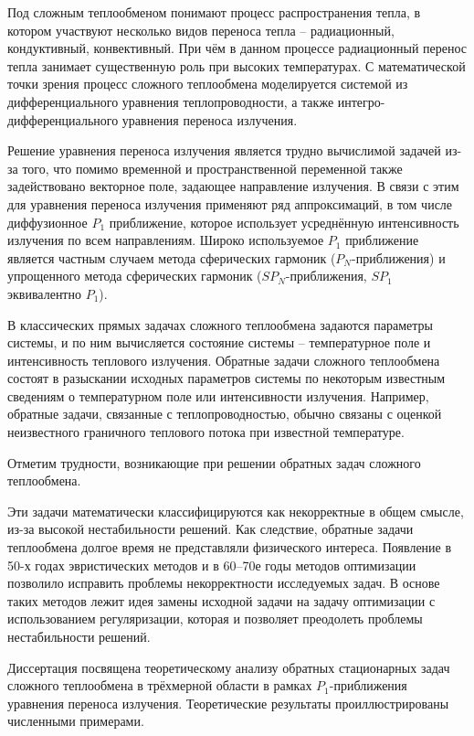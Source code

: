 {\actuality}
Под сложным теплообменом понимают процесс распространения тепла,
в котором участвуют несколько видов переноса тепла – радиационный, кондуктивный, конвективный.
При чём в данном процессе радиационный перенос тепла занимает существенную роль при высоких температурах.
С математической точки зрения процесс сложного теплообмена моделируется системой из
дифференциального уравнения теплопроводности, а также интегро-дифференциального
уравнения переноса излучения.


Решение уравнения переноса излучения является трудно вычислимой задачей из-за того,
что помимо временной и пространственной переменной также задействовано
векторное поле, задающее направление излучения.
В связи с этим для уравнения переноса излучения применяют ряд аппроксимаций,
в том числе диффузионное $P_1$ приближение, которое использует
усреднённую интенсивность излучения по всем направлениям.
Широко используемое $P_1$ приближение является частным случаем метода сферических
гармоник ($P_N$-приближения) и упрощенного метода сферических гармоник
($SP_N$-приближения, $SP_1$ эквивалентно $P_1$).


В классических прямых задачах сложного теплообмена задаются параметры системы, и по ним вычисляется
состояние системы – температурное поле и интенсивность теплового излучения.
Обратные задачи сложного теплообмена состоят в разыскании исходных параметров системы по некоторым
известным сведениям о температурном поле или интенсивности излучения.
Например, обратные задачи, связанные с теплопроводностью, обычно связаны с
оценкой неизвестного граничного теплового потока при известной температуре.


Отметим трудности, возникающие при решении обратных задач сложного теплообмена.


Эти задачи математически классифицируются как некорректные в общем смысле,
из-за высокой нестабильности решений.
Как следствие, обратные задачи теплообмена долгое время не представляли физического интереса.
Появление в 50-х годах эвристических методов и в 60–70е годы методов оптимизации
позволило исправить проблемы некорректности исследуемых задач.
В основе таких методов лежит идея замены исходной задачи на задачу оптимизации
с использованием регуляризации, которая и позволяет преодолеть проблемы нестабильности решений.



Диссертация посвящена теоретическому анализу обратных стационарных
задач сложного теплообмена в трёхмерной области в рамках $P_1$-приближения
уравнения переноса излучения.
Теоретические результаты проиллюстрированы численными примерами.


